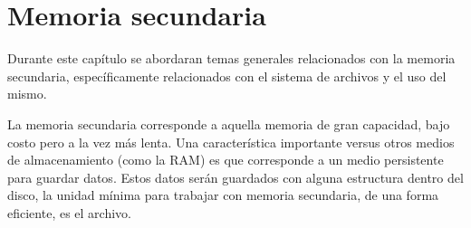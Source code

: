 %
%
%
%

\chapter{Memoria secundaria}
\label{memoria_secundaria}
Durante este capítulo se abordaran temas generales relacionados con la memoria
secundaria, específicamente relacionados con el sistema de archivos y el uso del
mismo.

La memoria secundaria corresponde a aquella memoria de gran capacidad, bajo
costo pero a la vez más lenta. Una característica importante versus otros medios
de almacenamiento (como la RAM) es que corresponde a un medio persistente para
guardar datos. Estos datos serán guardados con alguna estructura dentro del
disco, la unidad mínima para trabajar con memoria secundaria, de una forma
eficiente, es el archivo.

